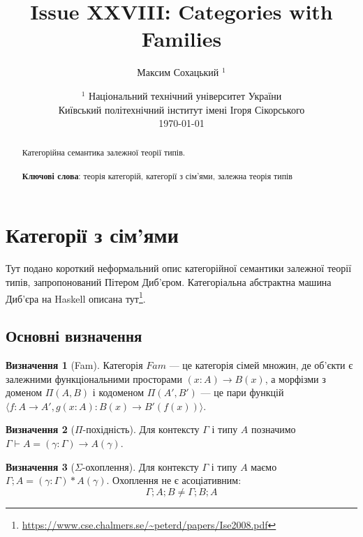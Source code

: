 \documentclass{article}
\theoremstyle{definition}
\newtheorem{definition}{Визначення}[section]
\begin{document}
\title{Issue XXVIII: Categories with Families}
\author{Максим Сохацький $^1$}
\date{ $^1$ Національний технічний університет України \\
       \small Київський політехнічний інститут імені Ігоря Сікорського \\
       \today }

\maketitle

\begin{abstract}

Категорійна семантика залежної теорії типів. \\
\\
{\bf Ключові слова}: теорія категорій, категорії з сім'ями, залежна теорія типів
\end{abstract}
\tableofcontents

\newpage
\section{Категорії з сім'ями}

Тут подано короткий неформальний опис категорійної семантики залежної теорії типів, запропонований Пітером Диб’єром.
Категоріальна абстрактна машина Диб'єра на Haskell описана тут\footnote{\url{https://www.cse.chalmers.se/~peterd/papers/Ise2008.pdf}}.

\subsection{Основні визначення}

\begin{definition}[Fam]
Категорія $Fam$ --- це категорія сімей множин, де об’єкти є залежними функціональними просторами $(x:A)\rightarrow B(x)$, а морфізми з доменом $\Pi(A,B)$ і кодоменом $\Pi(A',B')$ --- це пари функцій $\langle f:A\rightarrow A', g(x:A):B(x)\rightarrow B'(f(x)) \rangle$.
\end{definition}

\begin{definition}[$\Pi$-похідність]
Для контексту $\Gamma$ і типу $A$ позначимо $\Gamma\vdash A = (\gamma:\Gamma)\rightarrow A(\gamma)$.
\end{definition}

\begin{definition}[$\Sigma$-охоплення]
Для контексту $\Gamma$ і типу $A$ маємо $\Gamma;A = (\gamma:\Gamma)*A(\gamma)$. Охоплення не є асоціативним:
\[
    \Gamma;A;B \neq \Gamma;B;A
\]
\end{definition}
\end{document}

